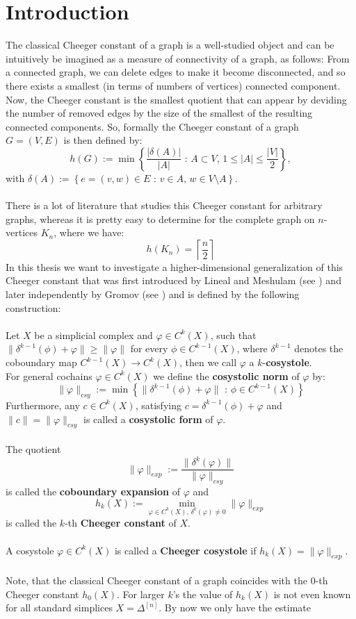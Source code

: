 
\chapter{Introduction}

\label{Introduction}
The classical Cheeger constant of a graph is a well-studied object and can be intuitively be imagined as a measure of connectivity of a graph, as follows: From a connected graph, we can delete edges to make it become disconnected, and so there exists a smallest (in terms of numbers of vertices) connected component. Now, the Cheeger constant is the smallest quotient that can appear by deviding the number of removed edges by the size of the smallest of the resulting connected components. So, formally the Cheeger constant of a graph \(G=(V,E)\) is then defined by:
\[
h(G):=\min\left\{\frac{|\delta(A)|}{|A|}\text{ : }A\subset V\text{, }1\leq |A|\leq\frac{|V|}{2}\right\},
\]
with \(\delta(A):=\left\{e=(v,w)\in E\text{ : }v\in A\text{, }w\in V\setminus A\right\}\).\\
\\
There is a lot of literature that studies this Cheeger constant for arbitrary graphs, whereas it is pretty easy to determine for the complete graph on \(n\)-vertices \(K_n\), where we have:
\[
h(K_n)=\left\lceil\frac{n}{2}\right\rceil
\]
In this thesis we want to investigate a higher-dimensional generalization of this Cheeger constant that was first introduced by Lineal and Meshulam (see \cite{2}) and later independently by Gromov (see \cite{3}) and is defined by the following construction:\\
\\
Let \(X\) be a simplicial complex and \(\varphi\in C^k(X)\), such that \(\|\delta^{k-1}(\phi)+\varphi\|\geq\|\varphi\|\) for every \(\phi\in C^{k-1}(X)\), where \(\delta^{k-1}\) denotes the coboundary map \(C^{k-1}(X)\rightarrow C^k(X)\), then we call \(\varphi\) a \(k\)-\textbf{cosystole}.\\
For general cochains \(\varphi\in C^k(X)\) we define the \textbf{cosystolic norm} of \(\varphi\) by:
\[
\|\varphi\|_{csy}:=\min\left\{\|\delta^{k-1}(\phi)+\varphi\|\text{ : }\phi\in C^{k-1}(X)\right\}
\]
Furthermore, any \(c\in C^k(X)\), satisfying \(c=\delta^{k-1}(\phi)+\varphi\) and \(\|c\|=\|\varphi\|_{csy}\) is called a \textbf{cosystolic form} of \(\varphi\).\\
\\
The quotient
\[
\|\varphi\|_{exp}:=\frac{\|\delta^k(\varphi)\|}{\|\varphi\|_{csy}}
\]
is called the \textbf{coboundary expansion} of \(\varphi\) and
\[
h_k(X):=\min\limits_{\varphi\in C^k(X)\text{, }\delta^k(\varphi)\neq 0}\|\varphi\|_{exp}
\]
is called the \(k\)-th \textbf{Cheeger constant} of \(X\).\\
\\
A cosystole \(\varphi\in C^k(X)\) is called a \textbf{Cheeger cosystole} if \(h_k(X)=\|\varphi\|_{exp}\).\\
\\
Note, that the classical Cheeger constant of a graph coincides with the \(0\)-th Cheeger constant \(h_0(X)\). For larger \(k\)'s the value of \(h_k(X)\) is not even known for all standard simplices \(X=\Delta^{[n]}\). By now we only have the estimate

